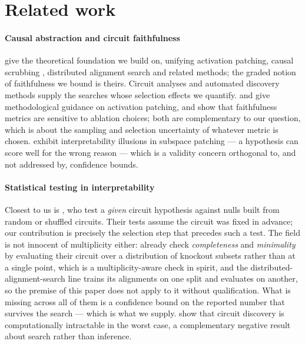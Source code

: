 

\section{Related work}
\label{sec:related}

\paragraph{Causal abstraction and circuit faithfulness}
\citet{geiger2025causalabstraction} give the theoretical foundation we build on,
unifying activation patching, causal scrubbing \citep{chan2022causal},
distributed alignment search \citep{geiger2024finding} and related methods; the
graded notion of faithfulness we bound is theirs. Circuit analyses
\citep{wang2023interpretability,hanna2023greaterthan,lieberum2023circuit,
marks2025sparsefeaturecircuits} and automated discovery methods
\citep{conmy2023towards,syed2024attribution,bhaskar2024edgepruning,kramar2024atp}
supply the searches whose selection effects we quantify.
\citet{zhang2024bestpractices} and \citet{heimersheim2024activationpatching} give
methodological guidance on activation patching, and \citet{miller2024faithfulness}
show that faithfulness metrics are sensitive to ablation choices; both are
complementary to our question, which is about the sampling and selection
uncertainty of whatever metric is chosen. \citet{makelov2024subspace} exhibit
interpretability illusions in subspace patching --- a hypothesis can score well
for the wrong reason --- which is a validity concern orthogonal to, and not
addressed by, confidence bounds.

\paragraph{Statistical testing in interpretability}
Closest to us is \citet{shi2024hypothesis}, who test a \emph{given} circuit
hypothesis against nulls built from random or shuffled circuits. Their tests
assume the circuit was fixed in advance; our contribution is precisely the
selection step that precedes such a test. The field is not innocent of
multiplicity either: \citet{wang2023interpretability} already check
\emph{completeness} and \emph{minimality} by evaluating their circuit over a
distribution of knockout subsets rather than at a single point, which is a
multiplicity-aware check in spirit, and the distributed-alignment-search line
\citep{geiger2024finding,wu2023interpretability} trains its alignments on one
split and evaluates on another, so the premise of this paper does not apply to it
without qualification. What is missing across all of them is a confidence bound
on the reported number that survives the search --- which is what we supply.
\citet{adolfi2025complexity} show that circuit discovery is computationally
intractable in the worst case, a complementary negative result about search
rather than inference.

